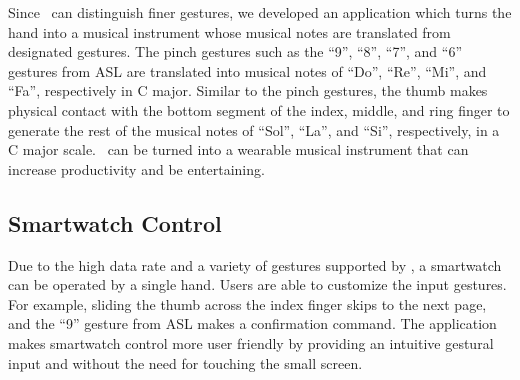 \documentclass{sigchi}
\begin{document}
Since \getTitleName\ can distinguish finer gestures, we developed an application which turns the hand into a musical instrument whose musical notes are translated from designated gestures. The pinch gestures such as the ``9'', ``8'', ``7'', and ``6'' gestures from ASL are translated into musical notes of ``Do'', ``Re'', ``Mi'', and ``Fa'', respectively in C major. Similar to the pinch gestures, the thumb makes physical contact with the bottom segment of the index, middle, and ring finger to generate the rest of the musical notes of ``Sol'', ``La'', and ``Si'', respectively, in a C major scale. \getTitleName\ can be turned into a wearable musical instrument that can increase productivity and be entertaining.

\subsection{Smartwatch Control}

Due to the high data rate and a variety of gestures supported by \getTitleName, a smartwatch can be operated by a single hand. Users are able to customize the input gestures. For example, sliding the thumb across the index finger skips to the next page, and the ``9'' gesture from ASL makes a confirmation command. The application makes smartwatch control more user friendly by providing an intuitive gestural input and without the need for touching the small screen. 

    
\end{document}
